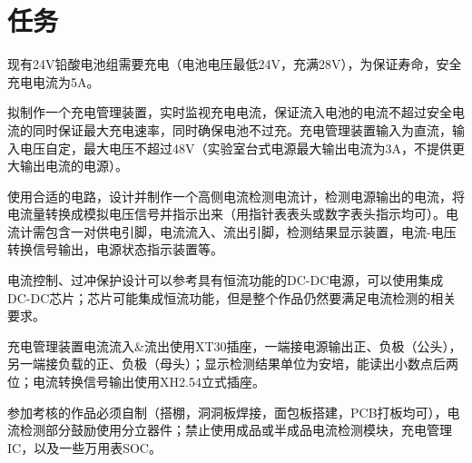 \section{任务}
现有24V铅酸电池组需要充电（电池电压最低24V，充满28V），为保证寿命，安全充电电流为5A。

拟制作一个充电管理装置，实时监视充电电流，保证流入电池的电流不超过安全电流的同时保证最大充电速率，同时确保电池不过充。充电管理装置输入为直流，输入电压自定，最大电压不超过48V（实验室台式电源最大输出电流为3A，不提供更大输出电流的电源）。

使用合适的电路，设计并制作一个高侧电流检测电流计，检测电源输出的电流，将电流量转换成模拟电压信号并指示出来（用指针表表头或数字表头指示均可）。电流计需包含一对供电引脚，电流流入、流出引脚，检测结果显示装置，电流-电压转换信号输出，电源状态指示装置等。

电流控制、过冲保护设计可以参考具有恒流功能的DC-DC电源，可以使用集成DC-DC芯片；芯片可能集成恒流功能，但是整个作品仍然要满足电流检测的相关要求。

充电管理装置电流流入\&流出使用XT30插座，一端接电源输出正、负极（公头），另一端接负载的正、负极（母头）；显示检测结果单位为安培，能读出小数点后两位；电流转换信号输出使用XH2.54立式插座。

参加考核的作品必须自制（搭棚，洞洞板焊接，面包板搭建，PCB打板均可），电流检测部分鼓励使用分立器件；禁止使用成品或半成品电流检测模块，充电管理IC，以及一些万用表SOC。
